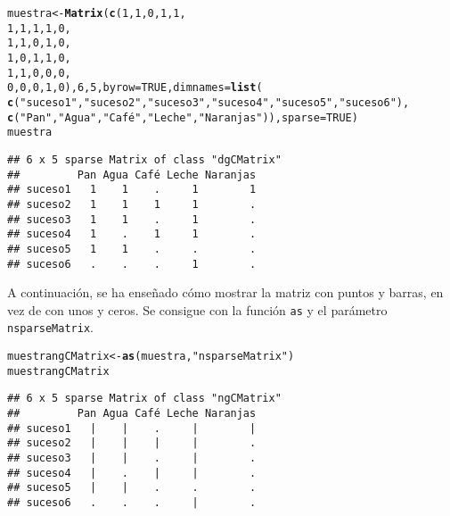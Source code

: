\documentclass[12pt]{report}\usepackage[]{graphicx}\usepackage[dvipsnames]{xcolor}
\makeatletter
\newcommand{\hlnum}[1]{\textcolor[rgb]{0.686,0.059,0.569}{#1}}%
\newcommand{\hlstr}[1]{\textcolor[rgb]{0.192,0.494,0.8}{#1}}%
\newcommand{\hlstd}[1]{\textcolor[rgb]{0.345,0.345,0.345}{#1}}%
\newcommand{\hlkwb}[1]{\textcolor[rgb]{0.69,0.353,0.396}{#1}}%
\newcommand{\hlkwc}[1]{\textcolor[rgb]{0.333,0.667,0.333}{#1}}%
\newcommand{\hlkwd}[1]{\textcolor[rgb]{0.737,0.353,0.396}{\textbf{#1}}}%
\newenvironment{kframe}{%
 \def\at@end@of@kframe{}%
 \ifinner\ifhmode%
  \def\at@end@of@kframe{\end{minipage}}%
  \begin{minipage}{\columnwidth}%
 \fi\fi%
 \def\FrameCommand##1{\hskip\@totalleftmargin \hskip-\fboxsep
 \colorbox{shadecolor}{##1}\hskip-\fboxsep
     \hskip-\linewidth \hskip-\@totalleftmargin \hskip\columnwidth}%
 \MakeFramed {\advance\hsize-\width
   \@totalleftmargin\z@ \linewidth\hsize
   \@setminipage}}%
 {\par\unskip\endMakeFramed%
 \at@end@of@kframe}
\newenvironment{knitrout}{}{} %
\makeatother
\begin{document}
\begin{knitrout}
\color{fgcolor}\begin{kframe}
\begin{alltt}
\hlstd{muestra} \hlkwb{<-} \hlkwd{Matrix}\hlstd{(}\hlkwd{c}\hlstd{(}\hlnum{1}\hlstd{,} \hlnum{1}\hlstd{,} \hlnum{0}\hlstd{,} \hlnum{1}\hlstd{,} \hlnum{1}\hlstd{,}
\hlnum{1}\hlstd{,} \hlnum{1}\hlstd{,} \hlnum{1}\hlstd{,} \hlnum{1}\hlstd{,} \hlnum{0}\hlstd{,}
\hlnum{1}\hlstd{,} \hlnum{1}\hlstd{,} \hlnum{0}\hlstd{,} \hlnum{1}\hlstd{,} \hlnum{0}\hlstd{,}
\hlnum{1}\hlstd{,} \hlnum{0}\hlstd{,} \hlnum{1}\hlstd{,} \hlnum{1}\hlstd{,} \hlnum{0}\hlstd{,}
\hlnum{1}\hlstd{,} \hlnum{1}\hlstd{,} \hlnum{0}\hlstd{,} \hlnum{0}\hlstd{,} \hlnum{0}\hlstd{,}
\hlnum{0}\hlstd{,} \hlnum{0}\hlstd{,} \hlnum{0}\hlstd{,} \hlnum{1}\hlstd{,} \hlnum{0}\hlstd{),} \hlnum{6}\hlstd{,} \hlnum{5}\hlstd{,} \hlkwc{byrow} \hlstd{=} \hlnum{TRUE}\hlstd{,} \hlkwc{dimnames} \hlstd{=} \hlkwd{list}\hlstd{(}
\hlkwd{c}\hlstd{(}\hlstr{"suceso1"}\hlstd{,} \hlstr{"suceso2"}\hlstd{,} \hlstr{"suceso3"}\hlstd{,} \hlstr{"suceso4"}\hlstd{,} \hlstr{"suceso5"}\hlstd{,} \hlstr{"suceso6"}\hlstd{),}
\hlkwd{c}\hlstd{(}\hlstr{"Pan"}\hlstd{,} \hlstr{"Agua"}\hlstd{,} \hlstr{"Café"}\hlstd{,} \hlstr{"Leche"}\hlstd{,} \hlstr{"Naranjas"}\hlstd{)),} \hlkwc{sparse}\hlstd{=}\hlnum{TRUE}\hlstd{)}
\hlstd{muestra}
\end{alltt}
\begin{verbatim}
## 6 x 5 sparse Matrix of class "dgCMatrix"
##         Pan Agua Café Leche Naranjas
## suceso1   1    1    .     1        1
## suceso2   1    1    1     1        .
## suceso3   1    1    .     1        .
## suceso4   1    .    1     1        .
## suceso5   1    1    .     .        .
## suceso6   .    .    .     1        .
\end{verbatim}
\end{kframe}
\end{knitrout}
			
			A continuación, se ha enseñado cómo mostrar la matriz con puntos y barras, en vez de con unos y ceros. Se consigue con la función \texttt{as} y el parámetro \texttt{nsparseMatrix}. 
			
\begin{knitrout}
\color{fgcolor}\begin{kframe}
\begin{alltt}
\hlstd{muestrangCMatrix} \hlkwb{<-} \hlkwd{as}\hlstd{(muestra,} \hlstr{"nsparseMatrix"}\hlstd{)}
\hlstd{muestrangCMatrix}
\end{alltt}
\begin{verbatim}
## 6 x 5 sparse Matrix of class "ngCMatrix"
##         Pan Agua Café Leche Naranjas
## suceso1   |    |    .     |        |
## suceso2   |    |    |     |        .
## suceso3   |    |    .     |        .
## suceso4   |    .    |     |        .
## suceso5   |    |    .     .        .
## suceso6   .    .    .     |        .
\end{verbatim}
\end{kframe}
\end{knitrout}
			
\end{document}
